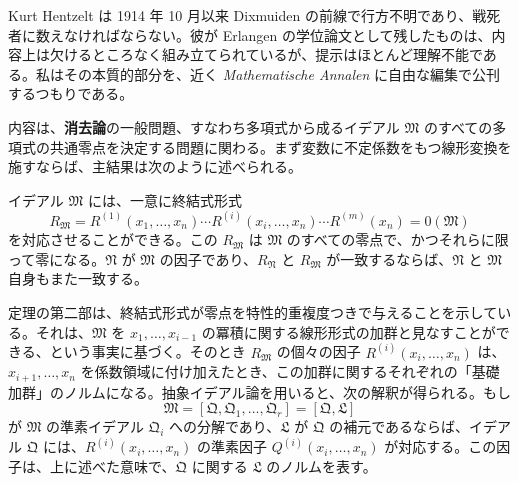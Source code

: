 Kurt Hentzelt は 1914 年 10 月以来 Dixmuiden の前線で行方不明であり、戦死者に数えなければならない。彼が Erlangen の学位論文として残したものは、内容上は欠けるところなく組み立てられているが、提示はほとんど理解不能である。私はその本質的部分を、近く \emph{Mathematische Annalen} に自由な編集で公刊するつもりである。

内容は、\textbf{消去論}の一般問題、すなわち多項式から成るイデアル $\mathfrak M$ のすべての多項式の共通零点を決定する問題に関わる。まず変数に不定係数をもつ線形変換を施すならば、主結果は次のように述べられる。

イデアル $\mathfrak M$ には、一意に終結式形式
\[
 R_{\mathfrak M}=R^{(1)}(x_1,
\ldots,x_n)\cdots R^{(i)}(x_i,
\ldots,x_n)\cdots R^{(m)}(x_n)=0(\mathfrak M)
\]
を対応させることができる。この $R_{\mathfrak M}$ は $\mathfrak M$ のすべての零点で、かつそれらに限って零になる。$\mathfrak N$ が $\mathfrak M$ の因子であり、$R_{\mathfrak N}$ と $R_{\mathfrak M}$ が一致するならば、$\mathfrak N$ と $\mathfrak M$ 自身もまた一致する。

定理の第二部は、終結式形式が零点を特性的重複度つきで与えることを示している。それは、$\mathfrak M$ を $x_1,\ldots,x_{i-1}$ の冪積に関する線形形式の加群と見なすことができる、という事実に基づく。そのとき $R_{\mathfrak M}$ の個々の因子 $R^{(i)}(x_i,\ldots,x_n)$ は、$x_{i+1},\ldots,x_n$ を係数領域に付け加えたとき、この加群に関するそれぞれの「基礎加群」のノルムになる。抽象イデアル論を用いると、次の解釈が得られる。もし
\[
 \mathfrak M=[\mathfrak Q,\mathfrak Q_1,
\ldots,
\mathfrak Q_r]=[\mathfrak Q,\mathfrak L]
\]
が $\mathfrak M$ の準素イデアル $\mathfrak Q_i$ への分解であり、$\mathfrak L$ が $\mathfrak Q$ の補元であるならば、イデアル $\mathfrak Q$ には、$R^{(i)}(x_i,\ldots,x_n)$ の準素因子 $Q^{(i)}(x_i,\ldots,x_n)$ が対応する。この因子は、上に述べた意味で、$\mathfrak Q$ に関する $\mathfrak L$ のノルムを表す。
